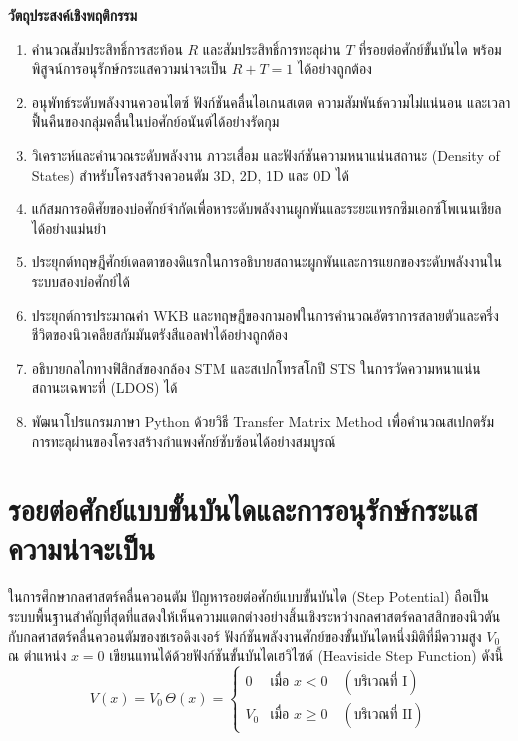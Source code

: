 \begin{lessonplanbox}
\noindent\textbf{วัตถุประสงค์เชิงพฤติกรรม}
\begin{enumerate}
    \item คำนวณสัมประสิทธิ์การสะท้อน $R$ และสัมประสิทธิ์การทะลุผ่าน $T$ ที่รอยต่อศักย์ขั้นบันได พร้อมพิสูจน์การอนุรักษ์กระแสความน่าจะเป็น $R + T = 1$ ได้อย่างถูกต้อง
    \item อนุพัทธ์ระดับพลังงานควอนไตซ์ ฟังก์ชันคลื่นไอเกนสเตต ความสัมพันธ์ความไม่แน่นอน และเวลาฟื้นคืนของกลุ่มคลื่นในบ่อศักย์อนันต์ได้อย่างรัดกุม
    \item วิเคราะห์และคำนวณระดับพลังงาน ภาวะเสื่อม และฟังก์ชันความหนาแน่นสถานะ (Density of States) สำหรับโครงสร้างควอนตัม 3D, 2D, 1D และ 0D ได้
    \item แก้สมการอดิศัยของบ่อศักย์จำกัดเพื่อหาระดับพลังงานผูกพันและระยะแทรกซึมเอกซ์โพเนนเชียลได้อย่างแม่นยำ
    \item ประยุกต์ทฤษฎีศักย์เดลตาของดิแรกในการอธิบายสถานะผูกพันและการแยกของระดับพลังงานในระบบสองบ่อศักย์ได้
    \item ประยุกต์การประมาณค่า WKB และทฤษฎีของกามอฟในการคำนวณอัตราการสลายตัวและครึ่งชีวิตของนิวเคลียสกัมมันตรังสีแอลฟาได้อย่างถูกต้อง
    \item อธิบายกลไกทางฟิสิกส์ของกล้อง STM และสเปกโทรสโกปี STS ในการวัดความหนาแน่นสถานะเฉพาะที่ (LDOS) ได้
    \item พัฒนาโปรแกรมภาษา Python ด้วยวิธี Transfer Matrix Method เพื่อคำนวณสเปกตรัมการทะลุผ่านของโครงสร้างกำแพงศักย์ซับซ้อนได้อย่างสมบูรณ์
\end{enumerate}
\end{lessonplanbox}

\newpage

\section{รอยต่อศักย์แบบขั้นบันไดและการอนุรักษ์กระแสความน่าจะเป็น}
\label{sec_step_potential}

ในการศึกษากลศาสตร์คลื่นควอนตัม ปัญหารอยต่อศักย์แบบขั้นบันได (Step Potential) ถือเป็นระบบพื้นฐานสำคัญที่สุดที่แสดงให้เห็นความแตกต่างอย่างสิ้นเชิงระหว่างกลศาสตร์คลาสสิกของนิวตันกับกลศาสตร์คลื่นควอนตัมของชเรอดิงเงอร์ ฟังก์ชันพลังงานศักย์ของขั้นบันไดหนึ่งมิติที่มีความสูง $V_0$ ณ ตำแหน่ง $x = 0$ เขียนแทนได้ด้วยฟังก์ชันขั้นบันไดเฮวิไซด์ (Heaviside Step Function) ดังนี้
\begin{equation}
V(x) = V_0 \, \Theta(x) = \begin{cases} 
0 & \text{เมื่อ } x < 0 \quad (\text{บริเวณที่ I}) \\ 
V_0 & \text{เมื่อ } x \ge 0 \quad (\text{บริเวณที่ II}) 
\end{cases}
\end{equation}

